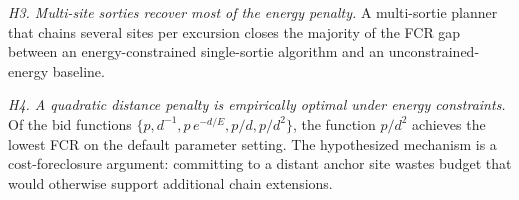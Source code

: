 \begin{doublespacing}
\emph{H3. Multi-site sorties recover most of the energy penalty.}
A multi-sortie planner that chains several sites per excursion closes
the majority of the FCR gap between an energy-constrained single-sortie
algorithm and an unconstrained-energy baseline.

\emph{H4. A quadratic distance penalty is empirically optimal under
energy constraints.} Of the bid functions
$\{p, d^{-1}, p\,e^{-d/E}, p/d, p/d^2\}$, the function $p/d^2$ achieves
the lowest FCR on the default parameter setting. The hypothesized
mechanism is a cost-foreclosure argument: committing to a distant
anchor site wastes budget that would otherwise support additional
chain extensions.

\end{doublespacing}
